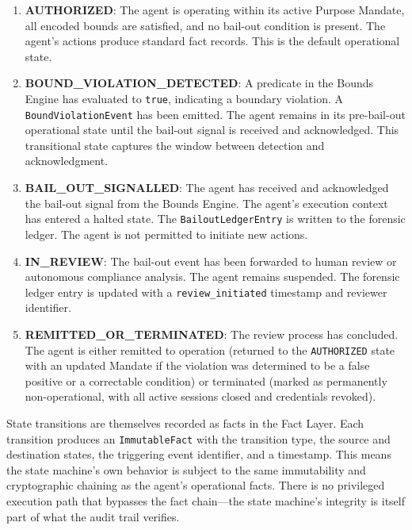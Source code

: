 \begin{enumerate}
  \item \textbf{AUTHORIZED}: The agent is operating within its active Purpose Mandate, all encoded bounds are satisfied, and no bail-out condition is present. The agent's actions produce standard fact records. This is the default operational state.

  \item \textbf{BOUND\_VIOLATION\_DETECTED}: A predicate in the Bounds Engine has evaluated to \texttt{true}, indicating a boundary violation. A \texttt{BoundViolationEvent} has been emitted. The agent remains in its pre-bail-out operational state until the bail-out signal is received and acknowledged. This transitional state captures the window between detection and acknowledgment.

  \item \textbf{BAIL\_OUT\_SIGNALLED}: The agent has received and acknowledged the bail-out signal from the Bounds Engine. The agent's execution context has entered a halted state. The \texttt{BailoutLedgerEntry} is written to the forensic ledger. The agent is not permitted to initiate new actions.

  \item \textbf{IN\_REVIEW}: The bail-out event has been forwarded to human review or autonomous compliance analysis. The agent remains suspended. The forensic ledger entry is updated with a \texttt{review\_initiated} timestamp and reviewer identifier.

  \item \textbf{REMITTED\_OR\_TERMINATED}: The review process has concluded. The agent is either remitted to operation (returned to the \texttt{AUTHORIZED} state with an updated Mandate if the violation was determined to be a false positive or a correctable condition) or terminated (marked as permanently non-operational, with all active sessions closed and credentials revoked).
\end{enumerate}

State transitions are themselves recorded as facts in the Fact Layer. Each transition produces an \texttt{ImmutableFact} with the transition type, the source and destination states, the triggering event identifier, and a timestamp. This means the state machine's own behavior is subject to the same immutability and cryptographic chaining as the agent's operational facts. There is no privileged execution path that bypasses the fact chain—the state machine's integrity is itself part of what the audit trail verifies.

